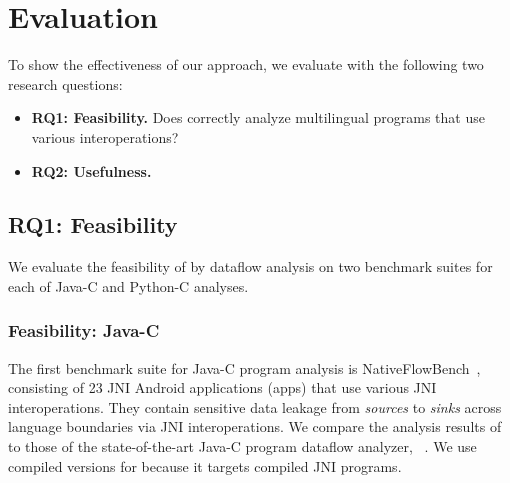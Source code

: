 \newcommand{\req}[1]{RQ#1}

\section{Evaluation}\label{sec:eval}



To show the effectiveness of our approach, we evaluate
\ours with the following two research questions:
\begin{itemize}
  \item \textbf{\req{1}: Feasibility.} Does \ours correctly analyze multilingual
    programs that use various interoperations?

  \item \textbf{\req{2}: Usefulness.} 
\end{itemize}

\subsection{\req{1}: Feasibility}
We evaluate the feasibility of \ours by dataflow analysis on
two benchmark suites for each of Java-C and Python-C analyses.

\subsubsection{Feasibility: Java-C}
The first benchmark suite for Java-C program analysis is NativeFlowBench~\cite{nativeflowbench, JN-SAF},
consisting of 23 JNI Android applications (apps) that use various JNI interoperations.
They contain sensitive data leakage from {\it sources} to {\it sinks}
across language boundaries via JNI interoperations.
We compare the analysis results of \ours to those of the state-of-the-art Java-C program
dataflow analyzer, \jnsaf~\cite{JN-SAF}. We use
compiled versions for \jnsaf because it targets compiled JNI programs.

